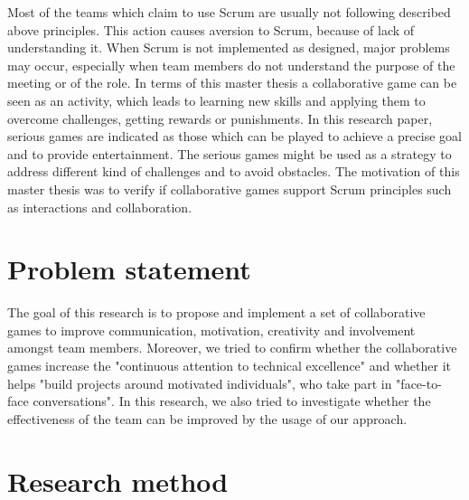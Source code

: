 Most of the teams which claim to use Scrum are usually not following described above principles. This action causes aversion to Scrum, because of lack of understanding it. When Scrum is not implemented as designed, major problems may occur, especially when team members do not understand the purpose of the meeting or of the role. In terms of this master thesis a collaborative game can be seen as an activity, which leads to learning new skills and applying them to overcome challenges, getting rewards or punishments. In this research paper, serious games are indicated as those which can be played to achieve a precise goal and to provide entertainment. The serious games might be used as a strategy to address different kind of challenges and to avoid obstacles\cite{MiguelGames}. The motivation of this master thesis was to verify if collaborative games support Scrum principles\cite{AgileManifesto} such as interactions and collaboration. 


\section{Problem statement}

The goal of this research is to propose and implement a set of collaborative games to improve communication, motivation, creativity and involvement amongst team members. Moreover, we tried to confirm whether the collaborative games increase the "continuous attention to technical excellence" and whether it helps "build projects around motivated individuals", who take part in "face-to-face conversations". In this research, we also tried to investigate whether the effectiveness of the team can be improved by the usage of our approach.

\section{Research method}


